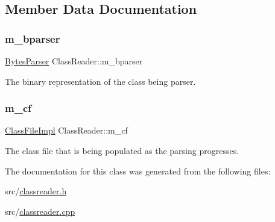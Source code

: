 \subsection{Member Data Documentation}
\mbox{\label{classClassReader_a11f0ce7b430b8abd5cb74b4273ddaab0}} 
\subsubsection{\texorpdfstring{m\+\_\+bparser}{m\_bparser}}
{\footnotesize\ttfamily \hyperlink{classBytesParser}{Bytes\+Parser} Class\+Reader\+::m\+\_\+bparser\hspace{0.3cm}{\ttfamily [private]}}



The binary representation of the class being parser. 

\mbox{\label{classClassReader_ad27b767f0ccf0826b0364977291894bc}} 
\subsubsection{\texorpdfstring{m\+\_\+cf}{m\_cf}}
{\footnotesize\ttfamily \hyperlink{classClassFileImpl}{Class\+File\+Impl} Class\+Reader\+::m\+\_\+cf\hspace{0.3cm}{\ttfamily [private]}}



The class file that is being populated as the parsing progresses. 



The documentation for this class was generated from the following files\+:\begin{DoxyCompactItemize}
\item 
src/\hyperlink{classreader_8h}{classreader.\+h}\item 
src/\hyperlink{classreader_8cpp}{classreader.\+cpp}\end{DoxyCompactItemize}
